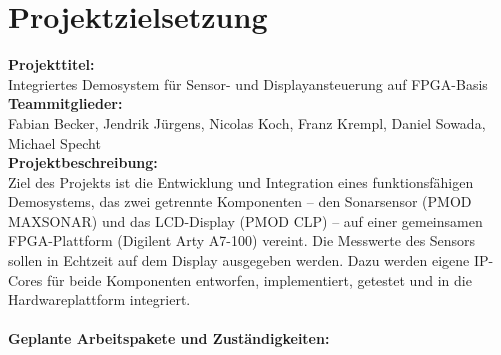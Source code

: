 \chapter{Projektzielsetzung}
\textbf{Projekttitel:}\\
Integriertes Demosystem für Sensor- und Displayansteuerung auf FPGA-Basis\\
\textbf{Teammitglieder:}\\
Fabian Becker, Jendrik Jürgens, Nicolas Koch, Franz Krempl, Daniel Sowada, Michael Specht\\
\textbf{Projektbeschreibung:}\\
Ziel des Projekts ist die Entwicklung und Integration eines funktionsfähigen Demosystems, das zwei getrennte Komponenten – den Sonarsensor (PMOD MAXSONAR) und das LCD-Display (PMOD CLP) – auf einer gemeinsamen FPGA-Plattform (Digilent Arty A7-100) vereint. Die Messwerte des Sensors sollen in Echtzeit auf dem Display ausgegeben werden. Dazu werden eigene IP-Cores für beide Komponenten entworfen, implementiert, getestet und in die Hardwareplattform integriert.\\\\
\textbf{Geplante Arbeitspakete und Zuständigkeiten:}
